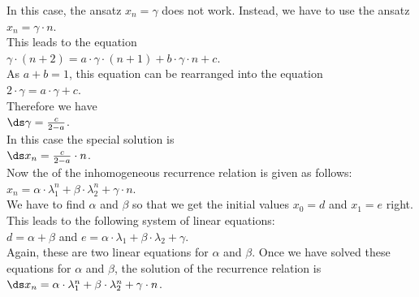 \begin{enumerate}
\begin{enumerate}
            In this case, the ansatz $x_n = \gamma$ does not work.  Instead, we have to use the ansatz
            \\[0.2cm]
            \hspace*{1.3cm}
            $x_n = \gamma \cdot n$.           
            \\[0.2cm]
            This leads to the equation
            \\[0.2cm]
            \hspace*{1.3cm}
            $\gamma \cdot (n+2) = a \cdot \gamma \cdot (n+1) + b \cdot \gamma \cdot n + c$.
            \\[0.2cm]
            As $a + b = 1$, this equation can be rearranged into the equation
            \\[0.2cm]
            \hspace*{1.3cm}
            $2 \cdot \gamma = a \cdot \gamma + c$.
            \\[0.2cm]
            Therefore we have 
            \\[0.2cm]
            \hspace*{1.3cm}
            $\ds \gamma = \frac{c}{2 - a}$.
            \\[0.2cm]
            In this case the special solution is
            \\[0.2cm]
            \hspace*{1.3cm}
            $\ds x_n = \frac{c}{2 - a} \cdot n$.
            \\[0.2cm]
            Now the  of the inhomogeneous recurrence relation is given as follows:
            \\[0.2cm]
            \hspace*{1.3cm}
            $x_n = \alpha \cdot \lambda_1^n + \beta \cdot \lambda_2^n + \gamma \cdot n$.
            \\[0.2cm]
            We have to find $\alpha$ and $\beta$ so that we get the initial values $x_0 = d$ and $x_1 = e$ right.
            This leads to the following system of linear equations:
            \\[0.2cm]
            \hspace*{1.3cm}
            $d = \alpha + \beta$ \quad and \quad $e = \alpha \cdot \lambda_1 + \beta \cdot \lambda_2 + \gamma$.
            \\[0.2cm]
            Again, these are two linear equations for $\alpha$ and $\beta$.  Once we have solved these equations for $\alpha$ and
            $\beta$, the solution of the recurrence relation is
            \\[0.2cm]
            \hspace*{1.3cm}
            $\ds x_{n} = \alpha \cdot \lambda_1^n + \beta \cdot \lambda_2^n + \gamma \cdot n$.
      \end{enumerate}
\end{enumerate}
